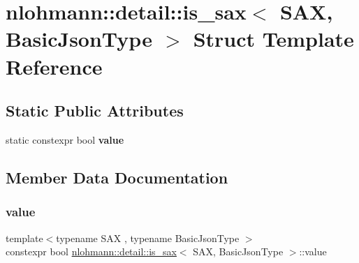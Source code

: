 \hypertarget{structnlohmann_1_1detail_1_1is__sax}{}\section{nlohmann\+:\+:detail\+:\+:is\+\_\+sax$<$ S\+AX, Basic\+Json\+Type $>$ Struct Template Reference}
\label{structnlohmann_1_1detail_1_1is__sax}
\subsection*{Static Public Attributes}
\begin{DoxyCompactItemize}
\item 
static constexpr bool {\bfseries value}
\end{DoxyCompactItemize}


\subsection{Member Data Documentation}
\mbox{\label{structnlohmann_1_1detail_1_1is__sax_a8ab7e51087000e948b4a2492257484dc}} 
\subsubsection{\texorpdfstring{value}{value}}
{\footnotesize\ttfamily template$<$typename S\+AX , typename Basic\+Json\+Type $>$ \\
constexpr bool \hyperlink{structnlohmann_1_1detail_1_1is__sax}{nlohmann\+::detail\+::is\+\_\+sax}$<$ S\+AX, Basic\+Json\+Type $>$\+::value\hspace{0.3cm}{\ttfamily [static]}}

